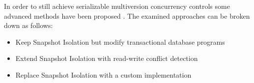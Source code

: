 In order to still achieve serializable multiversion concurrency controls some
advanced methods have been proposed \cite{fekete2005making,
cahill2009serializable, neumann2015fast}. The examined approaches can be broken
down as follows:

\begin{itemize}
    \item Keep Snapshot Isolation but modify transactional database programs
    \item Extend Snapshot Isolation with read-write conflict detection
    \item Replace Snapshot Isolation with a custom implementation
\end{itemize}

